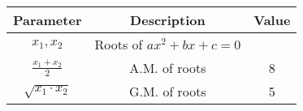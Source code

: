  \begin{tabular}{|c|c|c|}
        \hline
        \textbf{Parameter} & \textbf{Description} & \textbf{Value} \\
        \hline
        $ x_1, x_2 $ & Roots of  $ax^2 + bx + c = 0$ &  \\
        \hline
        $\frac{x_1 + x_2}{2}$& A.M. of roots & 8 \\
        \hline
        $\sqrt{x_1 \cdot x_2}$& G.M. of roots & 5 \\
        \hline
    \end{tabular}

